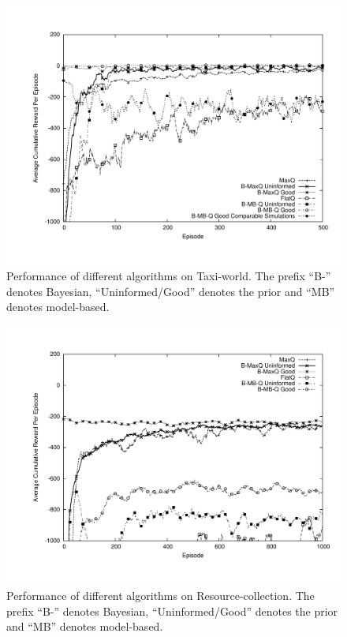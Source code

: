 \begin{figure}[t]
\centerline{\includegraphics[scale=0.4]{Taxi.pdf}}
\vspace{-0.5in}
\caption{Performance of different algorithms on {\sf Taxi-world}. The
  prefix ``B-'' denotes Bayesian, ``Uninformed/Good'' denotes the
  prior and ``MB'' denotes model-based.}\label{fig:taxi}
\end{figure}
\begin{figure}[t]
\centerline{\includegraphics[scale=0.4]{Wargus3322.pdf}}
\vspace{-0.5in}
\caption{Performance of different algorithms on {\sf
    Resource-collection}.  The
  prefix ``B-'' denotes Bayesian, ``Uninformed/Good'' denotes the
  prior and ``MB'' denotes model-based.}\label{fig:rc}
\end{figure}

